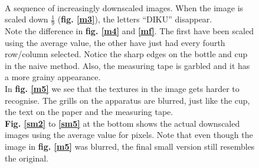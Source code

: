 \documentclass[a4paper, 10pt, final]{article}
\begin{document}
\begin{figure}[!h]
    \\
    \hspace{1em}
    \hspace{1em}
    \hspace{1em}
    \caption[]{A sequence of increasingly downscaled images. When the
    image is scaled down $\frac{1}{9}$ (\textbf{fig. \ref{m3}}), the
    letters ``DIKU'' disappear.\\
    Note the difference in \textbf{fig.  \ref{m4}} and
    \textbf{\ref{mf}}. The first have been scaled using the average
    value, the other have just had every fourth row/column selected.
    Notice the sharp edges on the bottle and cup in the naive method.
    Also, the measuring tape is garbled and it has a more grainy
    appearance.\\
    In \textbf{fig. \ref{m5}} we see that the textures in the image gets
    harder to recognise. The grills on the apparatus are blurred, just
    like the cup, the text on the paper and the measuring tape.\\
    \textbf{Fig.  \ref{sm2}} to \textbf{\ref{sm5}} at the bottom shows
    the actual downscaled images using the average value for pixels.
    Note that even though the image in \textbf{fig.  \ref{m5}} was
    blurred, the final small version still resembles the original.}
    \label{sequence_scale}
\end{figure}




\end{document}
